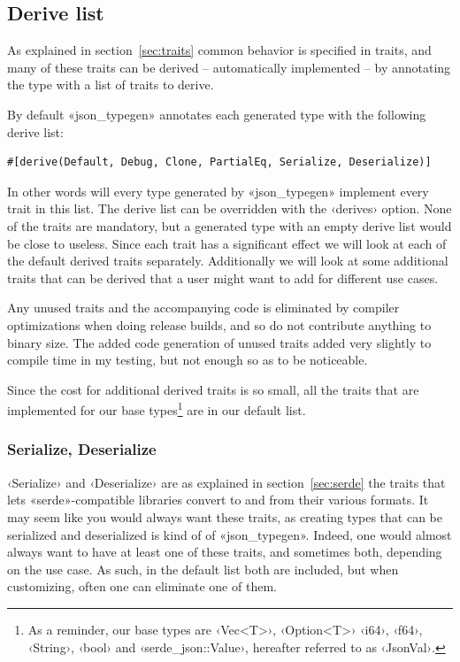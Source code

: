 \subsection{Derive list}
\label{sec:derive-list}

As explained in section~\ref{sec:traits} common behavior is specified in traits, and many of these traits can be derived -- automatically implemented -- by annotating the type with a list of traits to derive.

By default «json_typegen» annotates each generated type with the following derive list:

\begin{verbatim}
#[derive(Default, Debug, Clone, PartialEq, Serialize, Deserialize)]
\end{verbatim}

In other words will every type generated by «json_typegen» implement every trait in this list. The derive list can be overridden with the ‹derives› option. None of the traits are mandatory, but a generated type with an empty derive list would be close to useless. Since each trait has a significant effect we will look at each of the default derived traits separately. Additionally we will look at some additional traits that can be derived that a user might want to add for different use cases.

Any unused traits and the accompanying code is eliminated by compiler optimizations when doing release builds, and so do not contribute anything to binary size. The added code generation of unused traits added very slightly to compile time in my testing, but not enough so as to be noticeable.

Since the cost for additional derived traits is so small, all the traits that are implemented for our base types\footnote{As a reminder, our base types are ‹Vec<T>›, ‹Option<T>› ‹i64›, ‹f64›, ‹String›, ‹bool› and ‹serde_json::Value›, hereafter referred to as ‹JsonVal›.} are in our default list.

\subsubsection{Serialize, Deserialize}

‹Serialize› and ‹Deserialize› are as explained in section~\ref{sec:serde} the traits that lets «serde»-compatible libraries convert to and from their various formats. It may seem like you would always want these traits, as creating types that can be serialized and deserialized is kind of  of «json_typegen». Indeed, one would almost always want to have at least one of these traits, and sometimes both, depending on the use case. As such, in the default list both are included, but when customizing, often one can eliminate one of them. %


